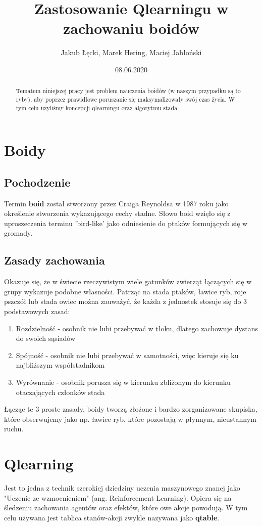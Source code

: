 \documentclass{article}
\title{Zastosowanie Qlearningu w zachowaniu boidów}
\author{Jakub Łęcki, Marek Hering, Maciej Jabłoński}
\date{08.06.2020}
\begin{document}
\maketitle
\begin{abstract}
    Tematem niniejszej pracy jest problem nauczenia boidów (w naszym przypadku są to ryby), aby poprzez prawidłowe poruszanie się maksymalizowały swój czas życia. W tym celu użyliśmy koncepcji qlearningu oraz algorytmu stada.
\end{abstract}

\section{Boidy}
\subsection{Pochodzenie}
Termin \textbf{boid} został stworzony przez Craiga Reynoldsa w 1987 roku jako określenie stworzenia wykazującego cechy stadne. Słowo boid wzięło się z uproszeczenia terminu 'bird-like' jako odniesienie do ptaków formujących się w gromady.
\subsection{Zasady zachowania}
\label{sec:flocking_behavior}
Okazuje się, że w świecie rzeczywistym wiele gatunków zwierząt łączących się w grupy wykazuje podobne własności. Patrząc na stada ptaków, ławice ryb, roje pszczół lub stada owiec można zauważyć, że każda z jednostek stosuje się do 3 podstawowych zasad:
\begin{enumerate}
    \item Rozdzielność - osobnik nie lubi przebywać w tłoku, dlatego zachowuje dystans do swoich sąsiadów
    \item Spójność - osobnik nie lubi przebywać w samotności, więc kieruje się ku najbliższym współstadnikom 
    \item Wyrównanie - osobnik porusza się w kierunku zbliżonym do kierunku otaczających członków stada
\end{enumerate}

Łącząc te 3 proste zasady, boidy tworzą złożone i bardzo zorganizowane skupiska, które obserwujemy jako np. ławice ryb, które pozostają w płynnym, nieustannym ruchu.
\section{Qlearning}
Jest to jedna z technik szerokiej dziedziny uczenia maszynowego znanej jako "Uczenie ze wzmocnieniem" (ang. Reinforcement Learning). Opiera się na śledzeniu zachowania agentów oraz efektów, które owe akcje powodują. W tym celu używana jest tablica stanów-akcji zwykle nazywana jako \textbf{qtable}.
\end{document}
